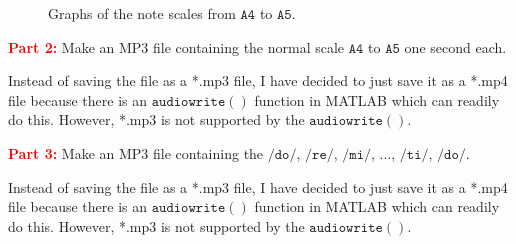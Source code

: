 \documentclass[a4paper, 12pt]{article}
\begin{document}
\begin{itemize}
\begin{itemize}
\pagebreak
\begin{figure}[h!]
\caption{Graphs of the note scales from $\mathtt{A4}$ to $\mathtt{A5}$.}
\end{figure}

\vspace{2cm}

\textcolor{red}{\textbf{Part 2:}}
Make an MP3 file containing the normal scale $\mathtt{A4}$ to $\mathtt{A5}$ one second each. \\

\begin{tcolorbox}[title={\textbf{Note:}}]
Instead of saving the file as a *.mp3 file, I have decided to just save it as a *.mp4 file because there is an $\mathtt{audiowrite()}$ function in MATLAB which can readily do this. However, *.mp3 is not supported by the  $\mathtt{audiowrite()}$.
\end{tcolorbox}

\begin{tcolorbox}[ pad at break = 1mm, break at=10cm,title={Source Code}]

\end{tcolorbox}


\textcolor{red}{\textbf{Part 3:}}
Make an MP3 file containing the $/\mathtt{do}/$, $/\mathtt{re}/$, $/\mathtt{mi}/$, ..., $/\mathtt{ti}/$, $/\mathtt{do}/$. \\

\begin{tcolorbox}[title={\textbf{Note:}}]
Instead of saving the file as a *.mp3 file, I have decided to just save it as a *.mp4 file because there is an $\mathtt{audiowrite()}$ function in MATLAB which can readily do this. However, *.mp3 is not supported by the  $\mathtt{audiowrite()}$.
\end{tcolorbox}


\end{itemize}
\end{itemize}
\end{document}
